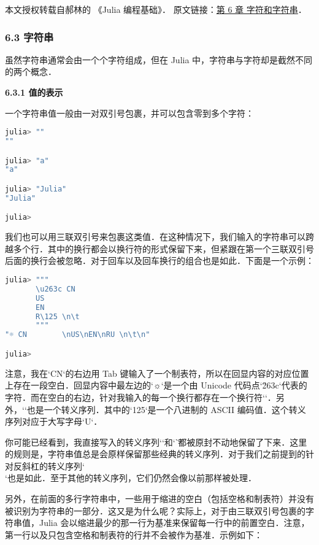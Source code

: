 
本文授权转载自郝林的 《Julia 编程基础》． 原文链接：\href{https://github.com/hyper0x/JuliaBasics/blob/master/book/ch06.md}{第 6 章 字符和字符串}．


\subsubsection{6.3 字符串}

虽然字符串通常会由一个个字符组成，但在 Julia 中，字符串与字符却是截然不同的两个概念．

\textbf{6.3.1 值的表示}

一个字符串值一般由一对双引号包裹，并可以包含零到多个字符：

\begin{lstlisting}[language=julia]
julia> ""
""

julia> "a"
"a"

julia> "Julia"
"Julia"

julia> 
\end{lstlisting}

我们也可以用三联双引号来包裹这类值．在这种情况下，我们输入的字符串可以跨越多个行．其中的换行都会以换行符的形式保留下来，但紧跟在第一个三联双引号后面的换行会被忽略．对于回车以及回车换行的组合也是如此．下面是一个示例：

\begin{lstlisting}[language=julia]
julia> """
       \u263c CN        
       US
       EN
       R\125 \n\t
       """
"☼ CN        \nUS\nEN\nRU \n\t\n"

julia> 
\end{lstlisting}

注意，我在`CN`的右边用 Tab 键输入了一个制表符，所以在回显内容的对应位置上存在一段空白．回显内容中最左边的`☼`是一个由 Unicode 代码点`\u263c`代表的字符．而在空白的右边，针对我输入的每一个换行都存在一个换行符`\n`．另外，``也是一个转义序列．其中的`125`是一个八进制的 ASCII 编码值．这个转义序列对应于大写字母`U`．

你可能已经看到，我直接写入的转义序列`\n`和`\t`都被原封不动地保留了下来．这里的规则是，字符串值总是会原样保留那些经典的转义序列．对于我们之前提到的针对反斜杠的转义序列`\\`也是如此．至于其他的转义序列，它们仍然会像以前那样被处理．

另外，在前面的多行字符串中，一些用于缩进的空白（包括空格和制表符）并没有被识别为字符串的一部分．这又是为什么呢？实际上，对于由三联双引号包裹的字符串值，Julia 会以缩进最少的那一行为基准来保留每一行中的前置空白．注意，第一行以及只包含空格和制表符的行并不会被作为基准．示例如下：

